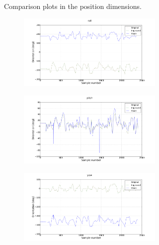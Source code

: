 \begin{figure}
\begin{subfigure}{0.48\textwidth}
\begin{subfigure}{\textwidth}
    \end{subfigure}
    \caption{Comparison plots in the position dimensions.}
  \end{subfigure}
  \begin{subfigure}{0.48\textwidth}
    \begin{subfigure}{\textwidth}
      \includegraphics[clip, trim = 100 0 100 0, width=\textwidth]{figures/chapter3/roll}
    \end{subfigure}
    \begin{subfigure}{\textwidth}
      \includegraphics[clip, trim = 100 0 100 0, width=\textwidth]{figures/chapter3/pitch}
    \end{subfigure}
    \begin{subfigure}{\textwidth}
      \includegraphics[clip, trim = 100 0 100 0, width=\textwidth]{figures/chapter3/yaw}

\end{subfigure}
\end{subfigure}
\end{figure}
